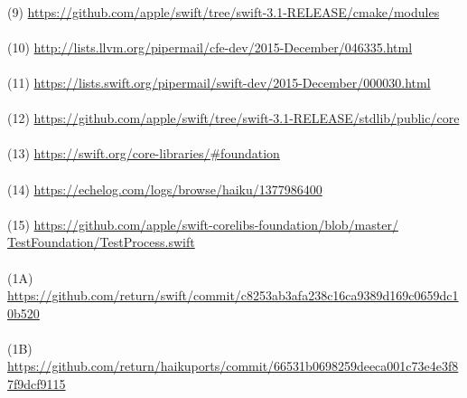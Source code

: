 \documentclass[12pt]{article}
\begin{document}
\\\hypertarget{(9)}{(9)} \href{https://github.com/apple/swift/tree/swift-3.1-RELEASE/cmake/modules}{https://github.com/apple/swift/tree/swift-3.1-RELEASE/cmake/modules}\vspace{0.125cm}\\
\\\hypertarget{(10)}{(10)} \href{http://lists.llvm.org/pipermail/cfe-dev/2015-December/046335.html}{http://lists.llvm.org/pipermail/cfe-dev/2015-December/046335.html}\vspace{0.125cm}\\
\\\hypertarget{(11)}{(11)} \href{https://lists.swift.org/pipermail/swift-dev/2015-December/000030.html}{https://lists.swift.org/pipermail/swift-dev/2015-December/000030.html}\vspace{0.125cm}\\
\\\hypertarget{(12)}{(12)} \href{https://github.com/apple/swift/tree/swift-3.1-RELEASE/stdlib/public/core}{https://github.com/apple/swift/tree/swift-3.1-RELEASE/stdlib/public/core}\vspace{0.125cm}\\
\\\hypertarget{(13)}{(13)} \href{https://swift.org/core-libraries/\#foundation}{https://swift.org/core-libraries/\#foundation}\vspace{0.125cm}\\
\\\hypertarget{(14)}{(14)} \href{https://echelog.com/logs/browse/haiku/1377986400}{https://echelog.com/logs/browse/haiku/1377986400}\vspace{0.125cm}\\
\\\hypertarget{(15)}{(15)} \href{https://github.com/apple/swift-corelibs-foundation/blob/master/TestFoundation/TestProcess.swift}{https://github.com/apple/swift-corelibs-foundation/blob/master/\\TestFoundation/TestProcess.swift}\vspace{0.125cm}\\
\\\hypertarget{(1A)}{(1A)} \href{https://github.com/return/swift/commit/c8253ab3afa238c16ca9389d169c0659dc10b520}{https://github.com/return/swift/commit/c8253ab3afa238c16ca9389d169c0659dc10b520} 
\\\\
\hypertarget{(1B)}{(1B)} \href{https://github.com/return/haikuports/commit/66531b0698259deeca001c73e4e3f87f9dcf9115}{https://github.com/return/haikuports/commit/66531b0698259deeca001c73e4e3f87f9dcf9115}
\end{document}
